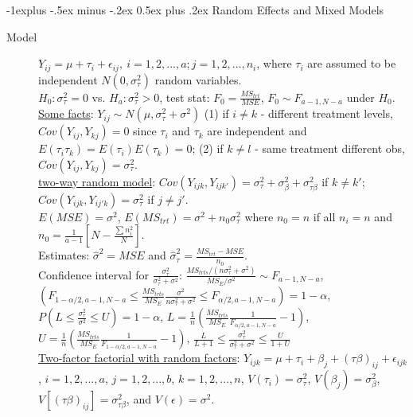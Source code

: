 \documentclass[10pt,landscape]{article}
\makeatletter
\renewcommand{\subsection}{\@startsection{subsection}{2}{0mm}%
                                {-1explus -.5ex minus -.2ex}%
                                {0.5ex plus .2ex}%
                                {\normalfont\normalsize\bfseries}}
\makeatother
\begin{document}
\begin{multicols}{3}
\subsection{Random Effects and Mixed Models}
\begin{description}
\item[Model] $Y_{ij} = \mu + \tau_i + \epsilon_{ij},\ i = 1,2,...,a; j = 1, 2,..., n_i$, where $\tau_i$  are assumed to be independent $N(0, \sigma_{\tau}^2)$ random variables. \\ 
$H_0: \sigma_{\tau}^2 = 0$ vs. $H_a: \sigma_{\tau}^2 > 0$, test stat: $F_0 = \frac{MS_{trt}}{MSE}$, $F_0 \sim F_{a-1,N-a}$ under $H_0$. \\
\underline{Some facts}: $Y_{ij} \sim N(\mu , \sigma_{\tau}^2+\sigma^2)$ (1) if $i\neq k$ - different treatment levels, $Cov(Y_{ij}, Y_{kj}) = 0$ since $\tau_i$ and $\tau_k$ are independent and $E(\tau_i\tau_k) = E(\tau_i)E(\tau_k) = 0$; (2) if $k \neq l$ - same treatment different obs, $Cov(Y_{ij}, Y_{kj}) = \sigma_{\tau}^2$. \\
\underline{two-way random model}: $Cov(Y_{ijk}, Y_{ijk'}) = \sigma_{\tau}^2 + \sigma_{\beta}^2 + \sigma_{\tau \beta}^2$ if $k \neq k'$; $Cov(Y_{ijk}, Y_{ij'k}) = \sigma_{\tau}^2$ if $j \neq j'$. \\
$E(MSE) = \sigma^2$, $E(MS_{trt}) = \sigma^2 + n_0\sigma_{\tau}^2$ where $n_0 = n$ if all $n_i = n$ and $n_0 = \frac{1}{a-1}[N-\frac{\sum n_i^2}{N}]$.\\
Estimates: $\hat{\sigma}^2 = MSE$ and $\hat{\sigma}_{\tau}^2 = \frac{MS_{trt} - MSE}{n_0}$.\\
Confidence interval for $\frac{\sigma_{\tau}^2}{\sigma_{\tau}^2 + \sigma^2}$: $\frac{MS_{trts} / (n\sigma_{\tau}^2 + \sigma^2)}{MS_E / \sigma^2} \sim F_{a-1,N-a}$, $(F_{1-\alpha/2, a-1, N-a} \leq \frac{MS_{trts}}{MS_E} \frac{\sigma^2}{n\sigma_{\tau}^2 + \sigma^2} \leq F_{\alpha /2, a-1, N-a}) = 1 - \alpha$, $P(L\leq \frac{\sigma_{\tau}^2}{\sigma^2} \leq U) = 1-\alpha$, $L = \frac{1}{n} (\frac{MS_{trts}}{MS_E} \frac{1}{F_{\alpha/2, a-1, N-a}} - 1)$, $U = \frac{1}{n} (\frac{MS_{trts}}{MS_E} \frac{1}{F_{1 - \alpha/2, a-1, N-a}} - 1)$, $\frac{L}{L+1} \leq \frac{\sigma_{\tau}^2}{\sigma_{\tau}^2 + \sigma^2} \leq \frac{U}{1+U}$\\
\underline{Two-factor factorial with random factors}: $Y_{ijk} = \mu + \tau_i + \beta_j + (\tau \beta)_{ij} + \epsilon_{ijk}$,  $i = 1,2,...,a$, $j = 1,2,...,b$, $k = 1,2,...,n$, $V(\tau_i) = \sigma_{\tau}^2$, $V(\beta_j) = \sigma_{\beta}^2$, $V[(\tau \beta)_{ij}] = \sigma_{\tau \beta}^2$, and $V(\epsilon) = \sigma^2$. \\

\end{description}
\end{multicols}
\end{document}
